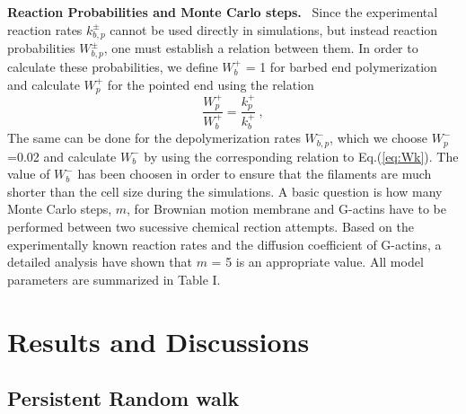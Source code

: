 \documentclass[aps,preprint,pre,array,epsfig,eqsecnum]{revtex4}
\begin{document}
\vskip0.2cm\noindent
{\bf Reaction Probabilities and Monte Carlo steps.}~
Since the experimental reaction rates $k^{\pm}_{b,p}$ cannot be used directly 
in simulations, 
but instead reaction probabilities $W^{\pm}_{b,p}$,
one must establish a relation between them.
In order to calculate these probabilities, 
we define $W^{+}_{b}$ = 1 for barbed end polymerization 
and calculate $W^{+}_{p}$
for the pointed end using the relation
\begin{equation}
\label{eq:Wk}
\frac{W^+_p}{W^+_b} = \frac{k^+_p}{k^+_b}~,
\end{equation}
%
The same can be done for the depolymerization rates $W^{-}_{b,p}$, which we
choose $W^-_p$=0.02 and calculate $W^-_b$ by using the corresponding relation
to Eq.(\ref{eq:Wk}).
The value of $W^-_b$ has been choosen in order to ensure that
the filaments are much shorter than the cell size during the simulations.
A basic question is how many Monte Carlo steps, $m$, for Brownian motion 
membrane and G-actins
have to be performed between two sucessive chemical rection attempts.
Based on the experimentally known reaction rates and the diffusion coefficient
of G-actins, a detailed analysis 
\cite{Satya04} have shown that $m$ =  5 is an appropriate value.
All model parameters are summarized in Table I.



\section{Results and Discussions}


\subsection{Persistent Random walk}
\end{document}
